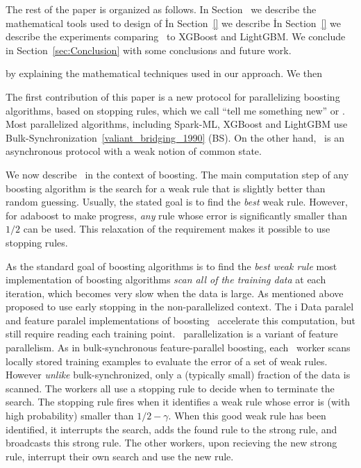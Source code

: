 The rest of the paper is organized as follows. In Section~\cite{} we
describe the mathematical tools used to design of \Sparrow\. In
Section~\ref{} we describe \Sparrow\. In Section~\ref{} we describe
the experiments comparing \Sparrow\ to XGBoost and LightGBM. We
conclude in Section~\ref{sec:Conclusion} with some conclusions and
future work.

\iffalse
by explaining the
mathematical techniques used in our approach. We then 

The first contribution of this paper is a new protocol for
parallelizing boosting algorithms, based on stopping rules, which we
call ``tell me something new'' or \tmsn. Most parallelized algorithms,
including Spark-ML, XGBoost and LightGBM use
Bulk-Synchronization~\ref{valiant_bridging_1990} (BS). On the other
hand, \tmsn\ is an asynchronous protocol with a weak notion of common state.

We now describe \tmsn\ in the context of boosting.
The main computation step of any boosting algorithm is the search for
a weak rule that is slightly better than random guessing. Usually, the
stated goal is to find the {\em best} weak rule. However, for adaboost
to make progress, {\em any} rule whose error is significantly smaller
than $1/2$ can be used. This relaxation of the requirement makes it
possible to use stopping rules.

As the standard goal of boosting algorithms is to find the {\em best
weak rule} most implementation of boosting algorithms {\em scan all
of the training data} at each iteration, which becomes very slow
when the data is large. As mentioned
above~\cite{domingo_scaling_2000,bradley_filterboost:_2007} proposed
to use early stopping in the non-parallelized context. The i
Data paralel and feature paralel
implementations of boosting~\cite{} accelerate this computation, but
still require reading each training point.  \tmsn\ parallelization is
a variant of feature parallelism. As in bulk-synchronous
feature-parallel boosting, each \tmsn\ worker scans locally stored
training examples to evaluate the error of a set of weak
rules. However {\em unlike} bulk-synchronized, only a (typically
small) fraction of the data is scanned.  The workers all use a
stopping rule to decide when to terminate the search. The stopping
rule fires when it identifies a weak rule whose error is (with high
probability) smaller than $1/2-\gamma$. When this good weak rule has
been identified, it interrupts the search, adds the found rule to the
strong rule, and broadcasts this strong rule. The other workers, upon
recieving the new strong rule, interrupt their own search and use the
new rule.

